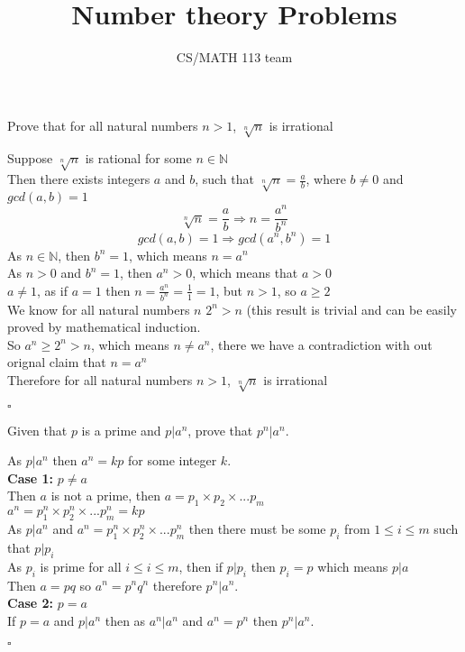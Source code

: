 \documentclass{exam}
\title{Number theory Problems}
\author{CS/MATH 113 team}
\begin{document}
\maketitle

\begin{questions}
    \question Prove that for all natural numbers $n>1$, $ \sqrt[n]{n}$ is irrational
    \begin{solution}
        Suppose $\sqrt[n]{n}$ is rational for some $n \in \mathbb{N}$
        \\Then there exists integers $a$ and $b$, such that $\sqrt[n]{n} = \frac{a}{b}$, where $b \neq 0$ and $gcd(a,b) =1$
        $$\sqrt[n]{n} = \frac{a}{b} \Rightarrow n = \frac{a^n}{b^n}$$
        $$gcd(a,b) =1 \Rightarrow gcd(a^n,b^n) =1$$
        As $n \in \mathbb{N}$, then $b^n = 1$, which means $n = a^n$
        \\As $n > 0$ and $b^n = 1$, then $a^n > 0$, which means that $a > 0$
        \\$a \neq 1$, as if $a = 1$ then $n = \frac{a^n}{b^n} = \frac{1}{1} = 1$, but $n > 1$, so $a \geq 2$
        \\We know for all natural numbers $n$ $2^n > n$ (this result is trivial and can be easily proved by mathematical induction.
        \\So $a^n \geq 2^n > n$, which means $n \neq a^n$, there we have a contradiction with out orignal claim that $n = a^n$
        \\Therefore for all natural numbers $n>1$, $ \sqrt[n]{n}$ is irrational
        \begin{flushright}
            $\square$
        \end{flushright}
    \end{solution}

    \question Given that $p$ is a prime and $p|a^n$, prove that $p^n|a^n$.
    \begin{solution}
        As $p|a^n$ then $a^n = kp$ for some integer $k$.
        \\\textbf{Case 1:} $p \neq a$
        \\Then $a$ is not a prime, then $a = p_1\times p_2 \times ... p_m$
        \\$a^n = p_1^n\times p_2^n \times ... p_m^n = kp$
        \\As $p|a^n$ and $a^n = p_1^n\times p_2^n \times ... p_m^n$ then there must be some $p_i$ from $1\leq i \leq m$ such that $p|p_i$
        \\As $p_i$ is prime for all $i \leq i \leq m$, then if $p|p_i$ then $p_i = p$ which means $p|a$
        \\Then $a = pq$ so $a^n = p^n q^n$ therefore $p^n|a^n$.
        \\\textbf{Case 2:} $p = a$ 
        \\If $p = a$  and $p|a^n$ then as $a^n|a^n$ and $a^n=p^n$ then $p^n|a^n$.
        \begin{flushright}
            $\square$
        \end{flushright}
    \end{solution}
    \pagebreak


\end{questions}
\end{document}
